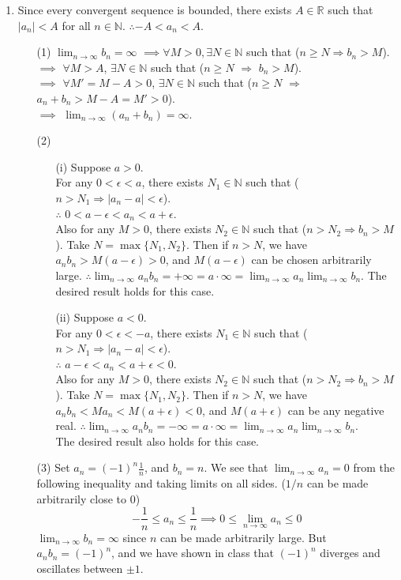 \documentclass[12pt]{report}
\newcommand{\numl}[1]{\item[\large\textbf{\sffamily #1.}]}
\newcommand{\bb}[1]{\mathbb{#1}}
\newcommand{\abs}[1]{\left|#1\right|}
\newcommand{\ds}{\displaystyle}
\begin{document}
\begin{enumerate}
\numl{2} Since every convergent sequence is bounded, there exists $A\in \bb{R}$ such that $\abs{a_n} < A$ for all $n\in \bb{N}$.  $\therefore -A < a_n < A$.
\begin{enumerate}
	\item[(1)] $\ds \lim_{n\rightarrow \infty} b_n = \infty$ $\implies \forall M>0, \exists N\in \bb{N}$ such that ($n \geq N \Rightarrow b_n > M$).\\ 
	$\implies$ $\forall M > A$, $\exists N\in \bb{N}$ such that ($n\geq N$ $\Rightarrow$ $b_n>M$).\\
	$\implies$ $\forall M' = M - A > 0$, $\exists N \in \bb{N}$ such that ($n \geq N$ $\Rightarrow$ $a_n+b_n > M - A = M' > 0$).\\
	$\implies$ $\ds \lim_{n\rightarrow \infty} (a_n+b_n) =\infty$.
	\item[(2)] 
	\begin{enumerate}
		\item[(i)] Suppose $a > 0$. \\For any $0 < \epsilon < a$, there exists $N_1 \in \bb{N}$ such that ($n > N_1 \Rightarrow \abs{a_n-a} < \epsilon$).\\
		$\therefore$ $0 < a - \epsilon < a_n < a + \epsilon$.\\
		Also for any $M > 0$, there exists $N_2\in\bb{N}$ such that ($n > N_2 \Rightarrow b_n > M$). Take $N = \max\{N_1, N_2\}$. Then if $n > N$, we have $a_nb_n > M(a-\epsilon) > 0$, and $M(a-\epsilon)$ can be chosen arbitrarily large. $\therefore \ds \lim_{n\rightarrow \infty} a_nb_n = +\infty = a \cdot \infty = \lim_{n\rightarrow \infty} a_n \lim_{n\rightarrow \infty} b_n$. The desired result holds for this case.
		\item[(ii)]	Suppose $a < 0$.\\For any $0 < \epsilon < -a$, there exists $N_1 \in \bb{N}$ such that ($n > N_1 \Rightarrow \abs{a_n-a} < \epsilon$).\\
		$\therefore$ $a - \epsilon < a_n < a + \epsilon < 0$.\\
		Also for any $M > 0$, there exists $N_2\in\bb{N}$ such that ($n > N_2 \Rightarrow b_n > M$). Take $N = \max\{N_1, N_2\}$. Then if $n > N$, we have $a_nb_n < Ma_n < M(a+\epsilon) < 0$, and $M(a+\epsilon)$ can be any negative real. $\therefore \ds \lim_{n\rightarrow \infty} a_nb_n = -\infty = a \cdot \infty = \lim_{n\rightarrow \infty} a_n \lim_{n\rightarrow \infty} b_n$. \\The desired result also holds for this case.
	\end{enumerate}
	\item[(3)] Set $a_n = \ds (-1)^n\frac{1}{n}$, and $b_n = n$. We see that $\ds \lim_{n\rightarrow \infty} a_n = 0$ from the following inequality and taking limits on all sides. ($1/n$ can be made arbitrarily close to 0)$$-\frac{1}{n} \leq a_n \leq \frac{1}{n} \implies 0 \leq \lim_{n\rightarrow \infty} a_n \leq 0$$
	$\ds\lim_{n\rightarrow \infty}b_n = \infty$ since $n$ can be made arbitrarily large. But $a_nb_n = (-1)^n$, and we have shown in class that $(-1)^n$ diverges and oscillates between $\pm 1$.
\end{enumerate}


\end{enumerate}
\end{document}
